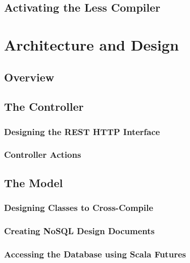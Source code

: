 \subsection{Activating the Less Compiler}


\section{Architecture and Design}

\subsection{Overview}


\subsection{The Controller}

\subsubsection{Designing the REST HTTP Interface}


\subsubsection{Controller Actions}


\subsection{The Model}

\subsubsection{Designing Classes to Cross-Compile}


\subsubsection{Creating NoSQL Design Documents}

\subsubsection{Accessing the Database using Scala Futures}

